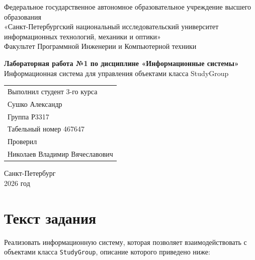 \documentclass[a4paper,12pt]{article}
\begin{document}
\begin{titlepage}
\centering
{\small
Федеральное государственное автономное образовательное учреждение высшего образования\\
«Санкт-Петербургский национальный исследовательский университет\\
информационных технологий, механики и оптики»\\[0.5cm]
Факультет Программной Инженерии и Компьютерной техники\\[2cm]
}

{\Large\bfseries Лабораторная работа №1 по дисциплине «Информационные системы»\\[0.5cm]}
{\large Информационная система для управления объектами класса StudyGroup\\[2cm]}

\vspace{4 cm}
\begin{flushright}
\begin{tabular}{l}
Выполнил студент 3-го курса\\
Сушко Александр\\
Группа Р3317\\
Табельный номер 467647\\[1cm]
Проверил\\
Николаев Владимир Вячеславович\\
\end{tabular}
\end{flushright}

\vfill
Санкт-Петербург\\2026 год
\end{titlepage}

\tableofcontents
\newpage

\section{Текст задания}

Реализовать информационную систему, которая позволяет взаимодействовать с объектами класса \texttt{StudyGroup}, описание которого приведено ниже:
\end{document}
